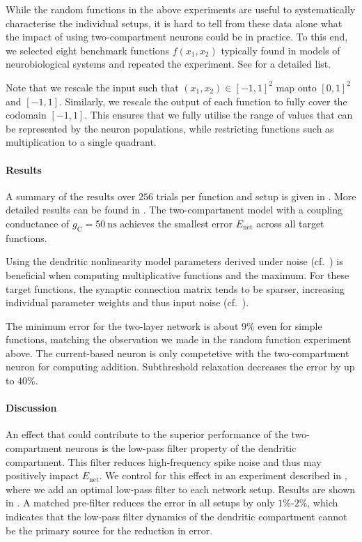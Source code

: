 While the random functions in the above experiments are useful to systematically characterise the individual setups, it is hard to tell from these data alone what the impact of using two-compartment neurons could be in practice.
To this end, we selected eight benchmark functions $f(x_1, x_2)$ typically found in models of neurobiological systems and repeated the experiment.
See  for a detailed list.

Note that we rescale the input such that $(x_1, x_2) \in [-1, 1]^2$ map onto $[0, 1]^2$ and $[-1, 1]$.
Similarly, we rescale the output of each function to fully cover the codomain $[-1, 1]$.
This ensures that we fully utilise the range of values that can be represented by the neuron populations, while restricting functions such as multiplication to a single quadrant.

\paragraph{Results}
A summary of the results over $256$ trials per function and setup is given in .
More detailed results can be found in .
The two-compartment model with a coupling conductance of $g_\mathrm{C} = \SI{50}{\nano\second}$ achieves the smallest error $E_\mathrm{net}$ across all target functions.

Using the dendritic nonlinearity model parameters derived under noise (cf.~) is beneficial when computing multiplicative functions and the maximum.
For these target functions, the synaptic connection matrix tends to be sparser, increasing individual parameter weights and thus input noise (cf.~).

The minimum error for the two-layer network is about $9\%$ even for simple functions, matching the observation we made in the random function experiment above.
The current-based neuron is only competetive with the two-compartment neuron for computing addition.
Subthreshold relaxation decreases the error by up to $40\%$.

\paragraph{Discussion}
An effect that could contribute to the superior performance of the two-compartment neurons is the low-pass filter property of the dendritic compartment.
This filter reduces high-frequency spike noise and thus may positively impact $E_\mathrm{net}$.
We control for this effect in an experiment described in , where we add an optimal low-pass filter to each network setup.
Results are shown in .
A matched pre-filter reduces the error in all setups by only $1\%$-$2\%$, which indicates that the low-pass filter dynamics of the dendritic compartment cannot be the primary source for the reduction in error.

